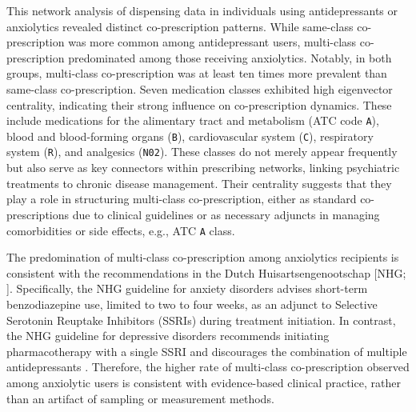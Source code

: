 \documentclass[
  authoryear,
  review]{elsarticle}
\begin{document}
This network analysis of dispensing data in individuals using
antidepressants or anxiolytics revealed distinct co-prescription
patterns. While same-class co-prescription was more common among
antidepressant users, multi-class co-prescription predominated among
those receiving anxiolytics. Notably, in both groups, multi-class
co-prescription was at least ten times more prevalent than same-class
co-prescription. Seven medication classes exhibited high eigenvector
centrality, indicating their strong influence on co-prescription
dynamics. These include medications for the alimentary tract and
metabolism (ATC code \texttt{A}), blood and blood-forming organs
(\texttt{B}), cardiovascular system (\texttt{C}), respiratory system
(\texttt{R}), and analgesics (\texttt{N02}). These classes do not merely
appear frequently but also serve as key connectors within prescribing
networks, linking psychiatric treatments to chronic disease management.
Their centrality suggests that they play a role in structuring
multi-class co-prescription, either as standard co-prescriptions due to
clinical guidelines or as necessary adjuncts in managing comorbidities
or side effects, e.g., ATC \texttt{A} class.

The predomination of multi-class co-prescription among anxiolytics
recipients is consistent with the recommendations in the Dutch
Huisartsengenootschap {[}NHG; \citet{NHG2019Anxiety}{]}. Specifically,
the NHG guideline for anxiety disorders advises short-term
benzodiazepine use, limited to two to four weeks, as an adjunct to
Selective Serotonin Reuptake Inhibitors (SSRIs) during treatment
initiation. In contrast, the NHG guideline for depressive disorders
recommends initiating pharmacotherapy with a single SSRI and discourages
the combination of multiple antidepressants \citep{NHG2023Depression}.
Therefore, the higher rate of multi-class co-prescription observed among
anxiolytic users is consistent with evidence-based clinical practice,
rather than an artifact of sampling or measurement methods.
\end{document}
